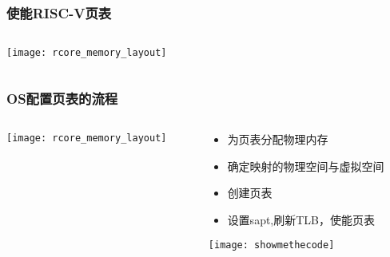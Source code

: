 \begin{frame} 
	\frametitle{使能RISC-V页表}
	
	\begin{columns}
		
		\begin{column}{1.\textwidth}
			\centering
			\texttt{[image: rcore\_memory\_layout]}
			
		\end{column}
		
		
		\begin{column}{.1\textwidth}
			
			
		\end{column}
		
		
	\end{columns}
\end{frame}


\begin{frame} 
	\frametitle{OS配置页表的流程}
	
	\begin{columns}
		
		\begin{column}{.4\textwidth}
			\texttt{[image: rcore\_memory\_layout]}
			
		\end{column}
		
		
		\begin{column}{.5\textwidth}
			
			\begin{itemize}
			\item 为页表分配物理内存 
			\item 确定映射的物理空间与虚拟空间
			\item 创建页表
			\item 设置sapt,刷新TLB，使能页表 \pause
		
			\end{itemize}
			\texttt{[image: showmethecode]}
		\end{column}
		
		
	\end{columns}
\end{frame}


